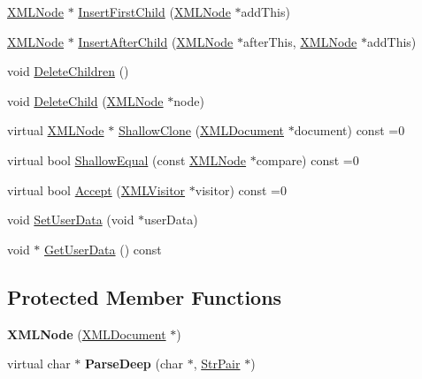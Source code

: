 \begin{DoxyCompactItemize}
\item 
\hyperlink{classtinyxml2_1_1_x_m_l_node}{X\+M\+L\+Node} $\ast$ \hyperlink{classtinyxml2_1_1_x_m_l_node_ac609a8f3ea949027f439280c640bbaf2}{Insert\+First\+Child} (\hyperlink{classtinyxml2_1_1_x_m_l_node}{X\+M\+L\+Node} $\ast$add\+This)
\item 
\hyperlink{classtinyxml2_1_1_x_m_l_node}{X\+M\+L\+Node} $\ast$ \hyperlink{classtinyxml2_1_1_x_m_l_node_a9275138a1b8dd5d8e2c26789bdc23ac8}{Insert\+After\+Child} (\hyperlink{classtinyxml2_1_1_x_m_l_node}{X\+M\+L\+Node} $\ast$after\+This, \hyperlink{classtinyxml2_1_1_x_m_l_node}{X\+M\+L\+Node} $\ast$add\+This)
\item 
void \hyperlink{classtinyxml2_1_1_x_m_l_node_a0360085cc54df5bff85d5c5da13afdce}{Delete\+Children} ()
\item 
void \hyperlink{classtinyxml2_1_1_x_m_l_node_a363b6edbd6ebd55f8387d2b89f2b0921}{Delete\+Child} (\hyperlink{classtinyxml2_1_1_x_m_l_node}{X\+M\+L\+Node} $\ast$node)
\item 
virtual \hyperlink{classtinyxml2_1_1_x_m_l_node}{X\+M\+L\+Node} $\ast$ \hyperlink{classtinyxml2_1_1_x_m_l_node_a83e3524e2ecea25eeab630c7ab113627}{Shallow\+Clone} (\hyperlink{classtinyxml2_1_1_x_m_l_document}{X\+M\+L\+Document} $\ast$document) const  =0
\item 
virtual bool \hyperlink{classtinyxml2_1_1_x_m_l_node_ac50408e91e095237f45716092ac2bddc}{Shallow\+Equal} (const \hyperlink{classtinyxml2_1_1_x_m_l_node}{X\+M\+L\+Node} $\ast$compare) const  =0
\item 
virtual bool \hyperlink{classtinyxml2_1_1_x_m_l_node_a366ad0e9b9ae8d1b18c00f903994b7a9}{Accept} (\hyperlink{classtinyxml2_1_1_x_m_l_visitor}{X\+M\+L\+Visitor} $\ast$visitor) const  =0
\item 
void \hyperlink{classtinyxml2_1_1_x_m_l_node_a002978fc889cc011d143185f2377eca2}{Set\+User\+Data} (void $\ast$user\+Data)
\item 
void $\ast$ \hyperlink{classtinyxml2_1_1_x_m_l_node_aa4442e68dca53c3f339238101ea55e30}{Get\+User\+Data} () const 
\end{DoxyCompactItemize}
\subsection*{Protected Member Functions}
\begin{DoxyCompactItemize}
\item 
\hypertarget{classtinyxml2_1_1_x_m_l_node_a29868df6ca383d574f584dfdd15105b6}{}{\bfseries X\+M\+L\+Node} (\hyperlink{classtinyxml2_1_1_x_m_l_document}{X\+M\+L\+Document} $\ast$)\label{classtinyxml2_1_1_x_m_l_node_a29868df6ca383d574f584dfdd15105b6}

\item 
\hypertarget{classtinyxml2_1_1_x_m_l_node_a7610d0f603e8b603d2078521811a23c1}{}virtual char $\ast$ {\bfseries Parse\+Deep} (char $\ast$, \hyperlink{classtinyxml2_1_1_str_pair}{Str\+Pair} $\ast$)\label{classtinyxml2_1_1_x_m_l_node_a7610d0f603e8b603d2078521811a23c1}

\end{DoxyCompactItemize}

